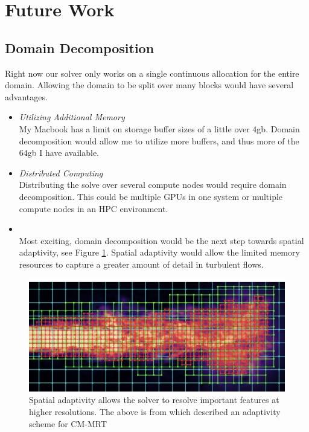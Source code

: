 \section{Future Work}

\subsection{Domain Decomposition}

Right now our solver only works on a single continuous allocation
for the entire domain.
Allowing the domain to be split over many blocks would have several 
advantages.
\begin{itemize}
  \item \textit{Utilizing Additional Memory } \\
My Macbook has a limit on storage buffer sizes of a little over $4$gb.
Domain decomposition would allow me to utilize more buffers, and thus more of the $64$gb I have available.

  \item \textit{Distributed Computing} \\
Distributing the solve over several compute nodes would require 
domain decomposition. 
This could be multiple GPUs in one system or
multiple compute nodes in an HPC environment.

  \item {} \\
Most exciting, domain decomposition would be the next step towards spatial adaptivity, see Figure \ref{fig:adaptivity}. 
Spatial adaptivity would allow the limited memory resources to
capture a greater amount of detail in turbulent flows.
\end{itemize}
\begin{figure}
\label{fig:adaptivity}
\begin{center}
  \includegraphics[width=0.6\linewidth]{adaptivity.png}
\end{center}
\caption{Spatial adaptivity allows the solver to resolve important features at higher resolutions. The above is from \cite{Li2018} which described an adaptivity scheme for CM-MRT}
\end{figure}
